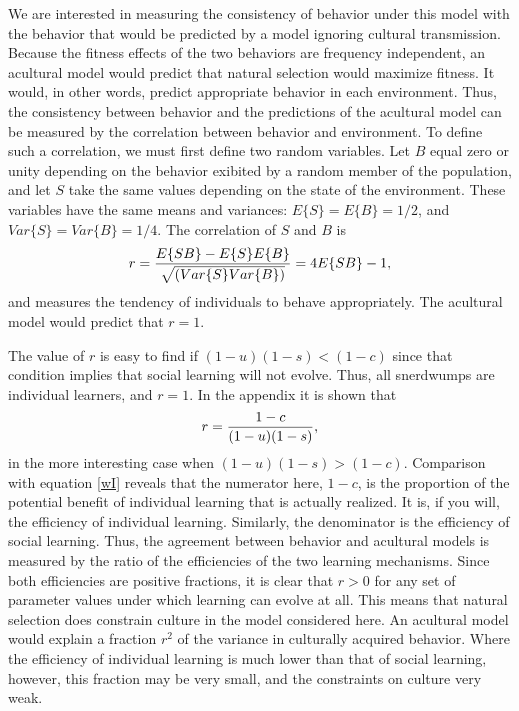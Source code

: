 \documentclass[11pt]{article}
\begin{document}
We are interested in measuring the consistency of behavior under this
model with the behavior that would be predicted by a model ignoring 
cultural transmission.  Because the fitness effects of the two behaviors
are frequency independent, an acultural model would predict that natural
selection would maximize fitness.  It would, in other words, predict
appropriate behavior in each environment.  Thus, the consistency between
behavior and the predictions of the acultural model can be measured by the
correlation between behavior and environment.  To define such a
correlation, we must first define two random variables.  Let $B$ equal
zero or unity depending on the behavior exibited by a random member of the
population, and let $S$ take the same values depending on the state of the
environment.  These variables have the same means and
variances: $E\{S\} = E\{B\} = 1/2$, and
$Var\{S\} = Var\{B\} = 1/4$.  The correlation of $S$ and $B$ is 
\begin{equation} \label{r}
r = {E\{SB\} - E\{S\}E\{B\} \over \sqrt{(Var\{S\}Var\{B\})}}
 = 4E\{SB\} - 1 ,
\end{equation}
and measures the tendency of individuals to behave appropriately.
The acultural model would predict that $r = 1$.

The value of $r$ is easy to find if $(1 - u)(1 - s) < (1 - c)$ since that
condition implies that social learning will not evolve.  Thus, all
snerdwumps are individual learners, and $r = 1$.  In the appendix it is
shown that
\begin{equation} \label{r2}
r =  {1 - c \over (1 - u)(1 - s)} ,
\end{equation}
in the more interesting case when $(1 - u)(1 - s) > (1 - c)$.  Comparison
with equation \ref{wI} reveals that the numerator here, $1 - c$, is the
proportion of the potential benefit of individual learning that is
actually realized.  It is, if you will, the efficiency of individual
learning.  Similarly, the denominator is the efficiency of social learning.
Thus, the agreement between behavior and acultural models is measured by
the ratio of the efficiencies of the two learning mechanisms.  Since both
efficiencies are positive fractions, it is clear that $r > 0$ for any set
of parameter values under which learning can evolve at all.  This means
that natural selection does constrain culture in the model considered
here.  An acultural model would explain a fraction $r^2$ of the variance
in culturally acquired behavior.  Where the efficiency of individual
learning is much lower than that of social learning, however, this
fraction may be very small, and the constraints on culture very weak.
\end{document}
